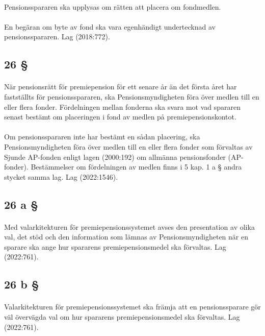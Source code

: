 \documentclass[a4paper,notitlepage,openany,10pt]{book}
\begin{document}
\paragraph*{}
Pensionsspararen ska upplysas om rätten att placera om fondmedlen.
\paragraph*{}
En begäran om byte av fond ska vara egenhändigt undertecknad av pensionsspararen.
Lag (2018:772).
\subsection*{26 §}
\paragraph*{}
När pensionsrätt för premiepension för ett senare år än det första året har fastställts för pensionsspararen, ska Pensionsmyndigheten föra över medlen till en eller flera fonder. Fördelningen mellan fonderna ska svara mot vad spararen senast bestämt om placeringen i fond av medlen på premiepensionskontot.
\paragraph*{}
Om pensionsspararen inte har bestämt en sådan placering, ska Pensionsmyndigheten föra över medlen till en eller flera fonder som förvaltas av Sjunde AP-fonden enligt lagen (2000:192) om allmänna pensionsfonder (AP-fonder). Bestämmelser om fördelningen av medlen finns i 5 kap. 1 a § andra stycket samma lag.
Lag (2022:1546).
\subsection*{26 a §}
\paragraph*{}
Med valarkitekturen för premiepensionssystemet avses den presentation av olika val, det stöd och den information som lämnas av Pensionsmyndigheten när en sparare ska ange hur spararens premiepensionsmedel ska förvaltas.
Lag (2022:761).
\subsection*{26 b §}
\paragraph*{}
Valarkitekturen för premiepensionssystemet ska främja att en pensionssparare gör väl övervägda val om hur spararens premiepensionsmedel ska förvaltas.
Lag (2022:761).
\end{document}
